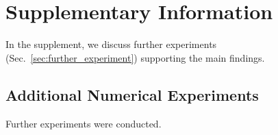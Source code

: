\documentclass[draft,linenumbers]{agujournal2019}
\begin{document}
\pagebreak
\clearpage

\renewcommand{\theequation}{S\arabic{equation}}
\renewcommand{\thesection}{S\arabic{section}}
\renewcommand{\thefigure}{S\arabic{figure}}

\setcounter{equation}{0}
\setcounter{figure}{0}
\setcounter{section}{0}

\section*{Supplementary Information}\label{sec:supp}
\noindent
In the supplement, we discuss further experiments (Sec.~\ref{sec:further_experiment}) supporting the main findings.

\subsection*{Additional Numerical Experiments}\label{sec:further_experiments}
Further experiments were conducted.
\end{document}
